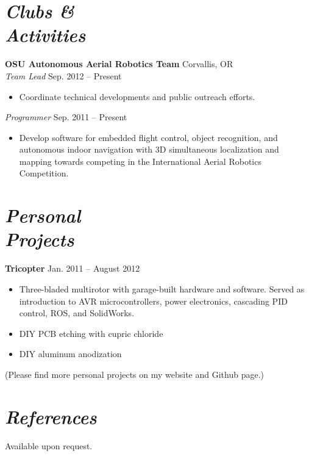 \documentclass[10pt,letterpaper,margin]{res}
\begin{document}
\begin{resume}
\section{\large\itshape Clubs \& \\ Activities}

{\bf OSU Autonomous Aerial Robotics Team} \hfill {\color{lightgray} Corvallis, OR} \\
{\it Team Lead} \hfill {\color{lightgray} Sep. 2012 -- Present}\vspace{0.2em}

\begin{itemize}
	\item Coordinate technical developments and public outreach efforts.
\end{itemize}

{\it Programmer} \hfill {\color{lightgray} Sep. 2011 -- Present}\vspace{0.2em}

\begin{itemize}
	\item Develop software for embedded flight control, object recognition, and
		autonomous indoor navigation with 3D simultaneous localization and
		mapping towards competing in the International Aerial Robotics
		Competition.
\end{itemize}



\section{\large\itshape Personal \\ Projects}

{\bf Tricopter} \hfill {\color{lightgray} Jan. 2011 -- August 2012}\vspace{0.2em}

\begin{itemize}
	\item Three-bladed multirotor with garage-built hardware and software.
		Served as introduction to AVR microcontrollers, power electronics,
		cascading PID control, ROS, and SolidWorks.
	\item DIY PCB etching with cupric chloride
	\item DIY aluminum anodization
\end{itemize}

{\footnotesize (Please find more personal projects on my website and Github page.)}



\section{\large\itshape References}

Available upon request.

\end{resume}
\end{document}
